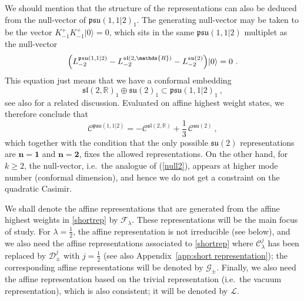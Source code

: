 \documentclass[12pt,a4paper]{article}
\newcommand{\be}{\begin{equation}}
\newcommand{\ee}{\end{equation}}
\begin{document}
We should mention that the structure of the representations can also be deduced from the null-vector of $\mathfrak{psu}(1,1|2)_1$. The generating null-vector may be taken to be the vector $K^+_{-1} K^+_{-1} |0\rangle = 0$, which sits in the same $\mathfrak{psu}(1,1|2)$ multiplet as the null-vector 
\be\label{null2}
\Bigl( L^{\mathfrak{psu}(1,1|2)}_{-2} - L^{\mathfrak{sl}(2,\mathds{R})}_{-2} - L^{\mathfrak{su}(2)}_{-2} \Bigr) |0\rangle = 0 \ . 
\ee
This equation just means that we have a conformal embedding 
\be
\mathfrak{sl}(2,\mathds{R})_1 \oplus \mathfrak{su}(2)_1 \subset \mathfrak{psu}(1,1|2)_1 \ , 
\ee
see also \cite{Bowcock:1999uy} for a related discussion. Evaluated on affine highest weight states, we therefore conclude that 
\be
\mathcal{C}^{\mathfrak{psu}(1,1|2)} = - \mathcal{C}^{\mathfrak{sl}(2,\mathds{R})} + \frac{1}{3} \, \mathcal{C}^{\mathfrak{su}(2)} \ , 
\ee
which together with the condition that the only possible $\mathfrak{su}(2)$ representations are $\mathbf{n}=\mathbf{1}$ and $\mathbf{n}=\mathbf{2}$, fixes the allowed representations. On the other hand, for $k\geq 2$, the null-vector, i.e.\ the analogue of (\ref{null2}),  appears at higher mode number (conformal dimension), and hence we do not get a constraint on the quadratic Casimir.
\smallskip

We shall denote the affine representations that are generated from the affine highest weights in \eqref{shortrep} by $\mathscr{F}_\lambda$. These representations will be the main focus of study. For $\lambda=\frac{1}{2}$, the affine representation is not irreducible (see below), and we also need the affine representations associated to \eqref{shortrep} where $\mathscr{C}^{j}_\lambda$ has been replaced by  $\mathscr{D}^j_\pm$ with $j=\frac{1}{2}$ (see also Appendix~\ref{app:short representation}); the corresponding affine representations will be denoted by $\mathscr{G}_\pm$. Finally, we also need the affine representation based on the trivial representation (i.e.~the vacuum representation), which is also consistent; it will be denoted by $\mathscr{L}$.

%
\end{document}
